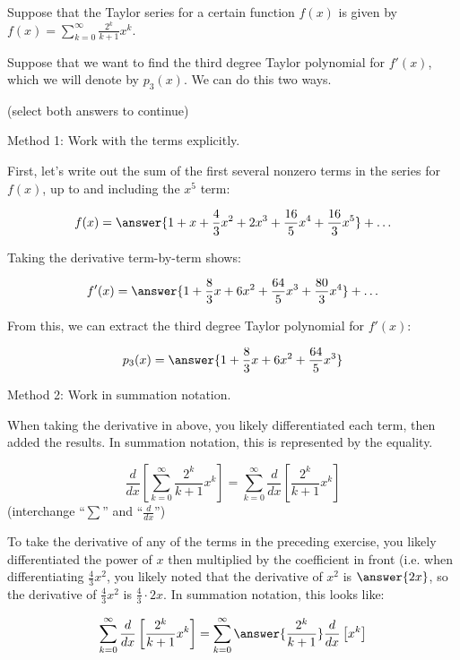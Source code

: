 \documentclass{ximera}
\author{Jim Talamo}
\begin{document}
\begin{exercise}
Suppose that the Taylor series for a certain function $f(x)$ is given by $f(x) = \sum_{k=0}^{\infty} \frac{2^k}{k+1} x^k$.  


Suppose that we want to find the third degree Taylor polynomial for $f'(x)$, which we will denote by $p_3(x)$.  We can do this two ways.

\begin{selectAll}
\end{selectAll}
(select both answers to continue)


Method 1: Work with the terms explicitly.

First, let's write out the sum of the first several nonzero terms in the series for $f(x)$, up to and including the $x^5$ term:

\[
f(x) = \answer{1+x+\frac{4}{3}x^2+2x^3+\frac{16}{5}x^4+\frac{16}{3}x^5}+\ldots
\]

Taking the derivative term-by-term shows:

\[
f'(x) = \answer{1+\frac{8}{3}x+6x^2+\frac{64}{5}x^3+\frac{80}{3}x^4}+\ldots
\]

From this, we can extract the third degree Taylor polynomial for $f'(x)$:

\[
p_3(x) = \answer{1+\frac{8}{3}x+6x^2+\frac{64}{5}x^3}
\] 



Method 2: Work in summation notation.

When taking the derivative in above, you likely differentiated each term, then added the results.  In summation notation, this is represented by the equality.


\[
\frac{d}{dx} \left[\sum_{k=0}^{\infty}  \frac{2^k}{k+1} x^k  \right] = \sum_{k=0}^{\infty}  \frac{d}{dx} \left[\frac{2^k}{k+1} x^k  \right]
\]
(interchange ``$\sum$'' and ``$\frac{d}{dx}$'')

To take the derivative of any of the terms in the preceding exercise, you likely differentiated the power of $x$ then multiplied by the coefficient in front (i.e. when differentiating $\frac{4}{3}x^2$, you likely noted that the derivative of $x^2$ is $\answer{2x}$, so the derivative of $\frac{4}{3}x^2$ is $\frac{4}{3} \cdot 2x$.  In summation notation, this looks like:

\[
\sum_{k=0}^{\infty}  \frac{d}{dx} \left[\frac{2^k}{k+1} x^k\right] = \sum_{k=0}^{\infty} \answer{\frac{2^k}{k+1}} \frac{d}{dx} \left[ x^k  \right]
\]


\end{exercise}
\end{document}
